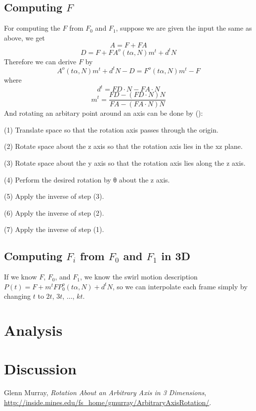 \documentclass[twoside,11pt]{article}
\begin{document}
\subsection{Computing $F$}
For computing the $F$ from $F_0$ and $F_1$, suppose we are given the input the same as above, we get
\begin{equation}
A = F + FA
\end{equation}
\begin{equation}
D = F + FA^o (t\alpha, N) m^t + d^t N
\end{equation}
Therefore we can derive $F$ by
\begin{equation}
A^o (t\alpha, N) m^t + d^t N - D = F^o (t\alpha, N) m^t - F
\end{equation}
where
\begin{equation}
d^t = FD \cdot N - FA \cdot N 
\end{equation}
\begin{equation}
m^t = \frac{FD - (FD \cdot N) N }{FA - (FA \cdot N) N}
\end{equation}
And rotating an arbitary point around an axis can be done by (\cite{murray13}): 

(1) Translate space so that the rotation axis passes through the origin.

(2) Rotate space about the z axis so that the rotation axis lies in the xz plane.

(3) Rotate space about the y axis so that the rotation axis lies along the z axis.

(4) Perform the desired rotation by θ about the z axis.

(5) Apply the inverse of step (3).

(6) Apply the inverse of step (2).

(7) Apply the inverse of step (1).

\subsection{Computing $F_i$ from $F_0$ and $F_1$ in 3D}
If we know $F$, $F_0$, and $F_1$, we know the swirl motion description $P(t) = F + m^t FP_0^o(t\alpha, N) + d^t N$, so we can interpolate each frame simply by changing $t$ to $2t$, $3t$, $\ldots$, $kt$.

\section{Analysis}


\section{Discussion}






\begin{thebibliography}{9}
  Glenn Murray,
  \emph{Rotation About an Arbitrary Axis in 3 Dimensions},
  \url{http://inside.mines.edu/fs_home/gmurray/ArbitraryAxisRotation/}.

\end{thebibliography}
\end{document}
